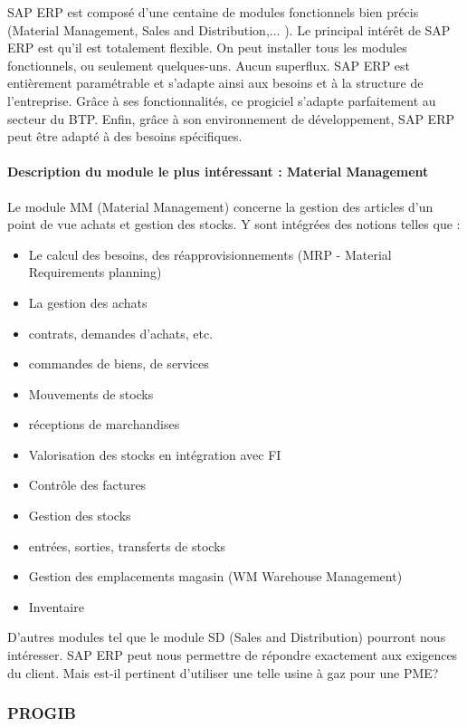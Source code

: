 		SAP ERP est composé d'une centaine de modules fonctionnels bien précis (Material Management, Sales and Distribution,... ).
		Le principal intérêt de SAP ERP est qu'il est totalement flexible. On peut installer tous les modules fonctionnels, ou seulement quelques-uns.
		Aucun superflux. SAP ERP est entièrement paramétrable et s'adapte ainsi aux besoins et à la structure de l'entreprise.
		Grâce à ses fonctionnalités, ce progiciel s'adapte parfaitement au secteur du BTP.
		Enfin, grâce à son environnement de développement, SAP ERP peut être adapté à des besoins spécifiques.\\
		\paragraph{Description du module le plus intéressant : Material Management}
		Le module MM (Material Management) concerne la gestion des articles d'un point de vue achats et gestion des stocks.
		Y sont intégrées des notions telles que :
		\begin{itemize}
		    \item Le calcul des besoins, des réapprovisionnements (MRP - Material Requirements planning)
		    \item La gestion des achats
		    \item contrats, demandes d'achats, etc.
		    \item commandes de biens, de services
		    \item Mouvements de stocks
		    \item réceptions de marchandises
		    \item Valorisation des stocks en intégration avec FI
		    \item Contrôle des factures
		    \item Gestion des stocks
		    \item entrées, sorties, transferts de stocks
		    \item Gestion des emplacements magasin (WM Warehouse Management)
		    \item Inventaire
		\end{itemize}

		D'autres modules tel que le module SD (Sales and Distribution) pourront nous intéresser.
		SAP ERP peut nous permettre de répondre exactement aux exigences du client. Mais est-il pertinent d'utiliser une telle usine à gaz pour une PME?

		\subsubsection{PROGIB}

